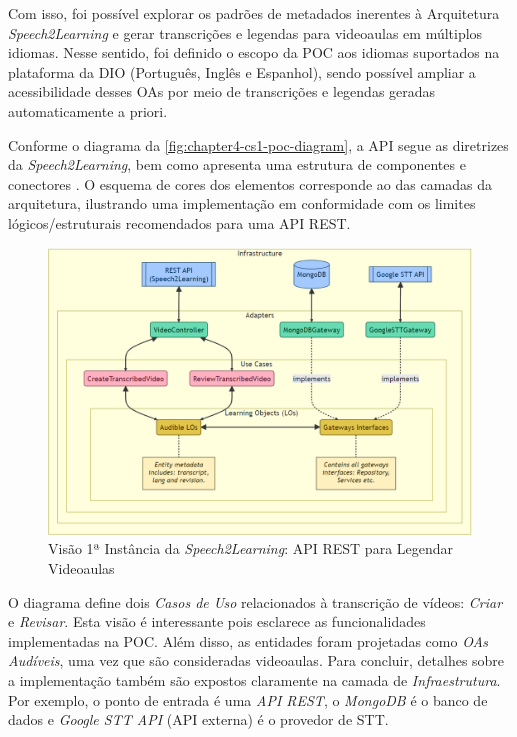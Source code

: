 Com isso, foi possível explorar os padrões de metadados inerentes à Arquitetura \textit{Speech2Learning} e gerar transcrições e legendas para videoaulas em múltiplos idiomas. Nesse sentido, foi definido o escopo da POC aos idiomas suportados na plataforma da DIO (Português, Inglês e Espanhol), sendo possível ampliar a acessibilidade desses OAs por meio de transcrições e legendas geradas automaticamente a priori.

Conforme o diagrama da \autoref{fig:chapter4-cs1-poc-diagram}, a API segue as diretrizes da \textit{Speech2Learning}, bem como apresenta uma estrutura de componentes e conectores \cite{Bass2021}. O esquema de cores dos elementos corresponde ao das camadas da arquitetura, ilustrando uma implementação em conformidade com os limites lógicos/estruturais recomendados para uma API REST.

\begin{figure}[htb]
\centering
\caption{Visão 1ª Instância da \textit{Speech2Learning}: API REST para Legendar Videoaulas}
\label{fig:chapter4-cs1-poc-diagram}
\includegraphics[width=\columnwidth]{images/chapter4-cs1-poc-diagram.png}
\end{figure}

O diagrama define dois \textit{Casos de Uso} relacionados à transcrição de vídeos: \textit{Criar} e \textit{Revisar}. Esta visão é interessante pois esclarece as funcionalidades implementadas na POC. Além disso, as entidades foram projetadas como \textit{OAs Audíveis}, uma vez que são consideradas videoaulas. Para concluir, detalhes sobre a implementação também são expostos claramente na camada de \textit{Infraestrutura}. Por exemplo, o ponto de entrada é uma \textit{API REST}, o \textit{MongoDB} é o banco de dados e \textit{Google STT API} (API externa) é o provedor de STT.

